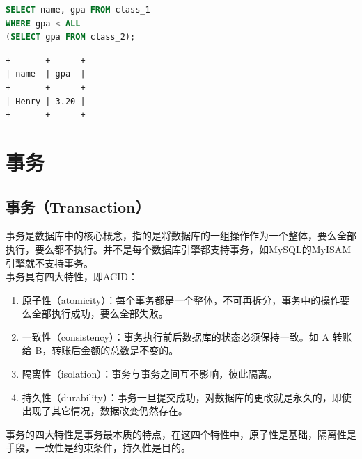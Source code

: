 \documentclass[12pt, openany, oneside]{book}
\begin{document}
\vspace{0.5cm}


\begin{lstlisting}[language=SQL]
SELECT name, gpa FROM class_1
WHERE gpa < ALL
(SELECT gpa FROM class_2);
\end{lstlisting}

\begin{tcolorbox}
    \begin{verbatim}
+-------+------+
| name  | gpa  |
+-------+------+
| Henry | 3.20 |
+-------+------+
	\end{verbatim}
\end{tcolorbox}

\newpage

\chapter{事务}

\section{事务（Transaction）}

事务是数据库中的核心概念，指的是将数据库的一组操作作为一个整体，要么全部执行，要么都不执行。并不是每个数据库引擎都支持事务，如MySQL的MyISAM引擎就不支持事务。 \\

事务具有四大特性，即ACID：

\begin{enumerate}
    \item 原子性（atomicity）：每个事务都是一个整体，不可再拆分，事务中的操作要么全部执行成功，要么全部失败。

    \item 一致性（consistency）：事务执行前后数据库的状态必须保持一致。如 A 转账给 B，转账后金额的总数是不变的。

    \item 隔离性（isolation）：事务与事务之间互不影响，彼此隔离。

    \item 持久性（durability）：事务一旦提交成功，对数据库的更改就是永久的，即使出现了其它情况，数据改变仍然存在。
\end{enumerate}

事务的四大特性是事务最本质的特点，在这四个特性中，原子性是基础，隔离性是手段，一致性是约束条件，持久性是目的。
\end{document}

